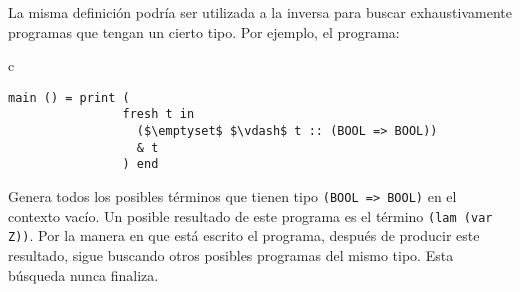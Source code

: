 La misma definición podría ser utilizada a la inversa
para buscar exhaustivamente programas que tengan un cierto tipo.
Por ejemplo, el programa:

\begin{center}
\begin{tabular}{c}
\begin{lstlisting}[mathescape=true]
main () = print (
                fresh t in
                  ($\emptyset$ $\vdash$ t :: (BOOL => BOOL))
                  & t
                ) end
\end{lstlisting}
\end{tabular}
\end{center}
Genera todos los posibles términos que tienen tipo \verb|(BOOL => BOOL)|
en el contexto vacío.
Un posible resultado de este programa es el término \verb|(lam (var Z))|.
Por la manera en que está escrito el programa, después de producir este
resultado, \nuflo sigue buscando otros posibles programas del mismo tipo.
Esta búsqueda nunca finaliza.

